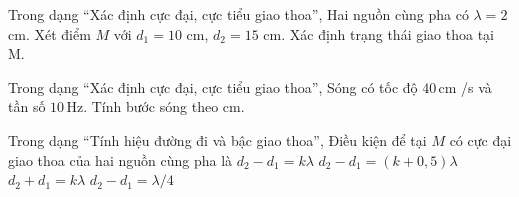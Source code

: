 \begin{ex}
Trong dạng “Xác định cực đại, cực tiểu giao thoa”, Hai nguồn cùng pha có $\lambda=2$ cm. Xét điểm $M$ với $d_1=10$ cm, $d_2=15$ cm. Xác định trạng thái giao thoa tại M.
\choiceTF

\end{ex}

\begin{ex}
Trong dạng “Xác định cực đại, cực tiểu giao thoa”, Sóng có tốc độ $40\,\text{cm}$ /s và tần số $10\,\text{Hz}$. Tính bước sóng theo cm.
\end{ex}

\begin{ex}
Trong dạng “Tính hiệu đường đi và bậc giao thoa”, Điều kiện để tại $M$ có cực đại giao thoa của hai nguồn cùng pha là
\choice
{\True $d_2-d_1=k\lambda$}
{$d_2-d_1=(k+0,5)\lambda$}
{$d_2+d_1=k\lambda$}
{$d_2-d_1=\lambda/4$}
\end{ex}

